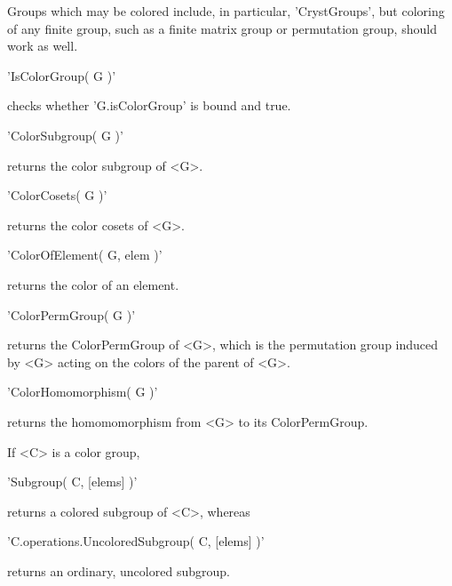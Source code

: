 Groups which may be colored  include,  in particular, 'CrystGroups',  but
coloring  of any  finite   group,  such as   a  finite  matrix  group  or
permutation group, should work as well.


'IsColorGroup( G )'         

checks whether 'G.isColorGroup' is bound and true.


'ColorSubgroup( G )'

returns the color subgroup of <G>.


'ColorCosets( G )'

returns the color cosets of <G>.


'ColorOfElement( G, elem )'

returns the color of an element.


'ColorPermGroup( G )'

returns the ColorPermGroup of <G>, which is the permutation group induced
by <G> acting on the colors of the parent of <G>.


'ColorHomomorphism( G )'

returns the homomomorphism from <G> to its ColorPermGroup.

%

If <C> is a color group, 

'Subgroup( C, [elems] )'

returns a colored subgroup of <C>, whereas

'C.operations.UncoloredSubgroup( C, [elems] )'

returns an ordinary, uncolored subgroup.

